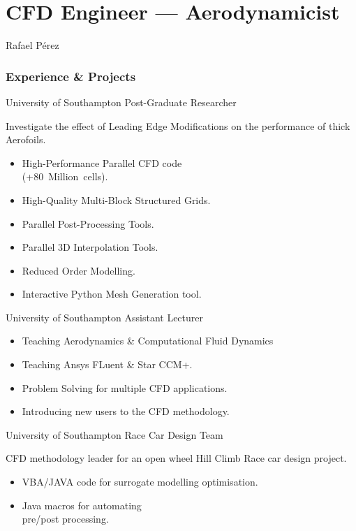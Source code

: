\documentclass[fontsize=10pt]{tccv}
\begin{document}
\part{CFD Engineer --- Aerodynamicist}{Rafael P\'erez}

\section{Experience \& Projects}
\begin{eventlist}
     {University of Southampton}
     {Post-Graduate Researcher}

Investigate the effect of Leading Edge Modifications on
the performance of thick Aerofoils.
\begin{itemize}
	\itemsep -1pt
	\item High-Performance Parallel CFD code \\ (+80~Million~cells).
	\item High-Quality Multi-Block Structured Grids.
	\item Parallel Post-Processing Tools.
	\item Parallel 3D Interpolation Tools.
	\item Reduced Order Modelling.
	\item Interactive Python Mesh Generation tool.
\end{itemize}

	{University of Southampton}
	{Assistant Lecturer}

\begin{itemize}
	\itemsep -1pt
	\item Teaching Aerodynamics \& Computational Fluid Dynamics
	\item Teaching Ansys FLuent \& Star CCM+.
	\item Problem Solving for multiple CFD applications.
	\item Introducing new users to the CFD methodology.
\end{itemize}

     {University of Southampton}
     {Race Car Design Team}

     CFD methodology leader for an open wheel Hill Climb Race car design project.
     \begin{itemize}
	\itemsep -1pt
     	\item VBA/JAVA code for surrogate modelling optimisation.
     	\item Java macros for automating\\ pre/post processing.
     \end{itemize}


\end{eventlist}
\end{document}

